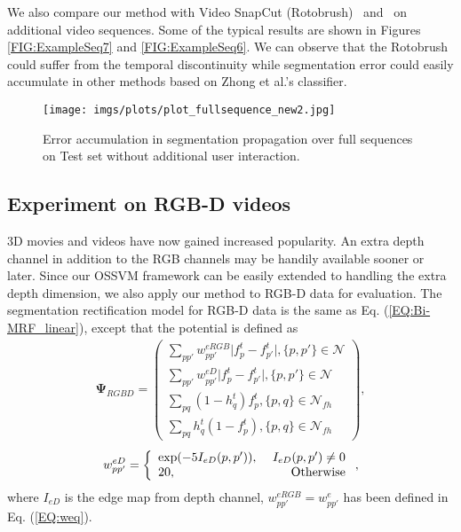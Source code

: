 \documentclass[10pt,journal,compsoc]{newIEEEtran}
\begin{document}
We also compare our method with Video SnapCut (Rotobrush)~\cite{Bai09VideoSnapCut_SIGGRAPH} and~\cite{Zhong2012UDC_SIGGRAPHAsia} on additional video sequences. Some of the typical results are shown in Figures \ref{FIG:ExampleSeq7} and \ref{FIG:ExampleSeq6}. We can observe that the Rotobrush could suffer from the temporal discontinuity while segmentation error could easily accumulate in other methods based on Zhong et al.'s classifier.
\begin{figure}[!t]
	\centering
	\texttt{[image: imgs/plots/plot\_fullsequence\_new2.jpg]}
	\caption{Error accumulation in segmentation propagation over full sequences on Test set without additional user interaction.  }\label{FIG:Rst_SeqPropag2}\vspace{-0.5cm}
\end{figure}\subsection{Experiment on RGB-D videos}
3D movies and videos have now gained increased popularity. An extra depth channel in addition to the RGB channels may be handily available sooner or later. Since our OSSVM framework can be easily extended to handling the extra depth dimension, we also apply our method to RGB-D data for evaluation. The segmentation rectification model for RGB-D data is the same as Eq. (\ref{EQ:Bi-MRF_linear}), except that the potential is defined as
\begin{equation}\label{EQ:DefinePsiRGBD}
\begin{split}
\mathbf{\Psi}_{RGBD} = \left(\begin{array}{l}
\sum_{pp'}w^{eRGB}_{pp'} \big|f^{t}_p-{f^{t}_{p'}}\big|,\{p,p'\}\in\mathcal{N} \\
\sum_{pp'}w^{eD}_{pp'} \big|f^{t}_p-{f^{t}_{p'}}\big|,\{p,p'\}\in\mathcal{N}\\
\sum_{pq}(1-h^t_q)f^{t}_p,\{p,q\}\in\mathcal{N}_{fh} \\
\sum_{pq}h^t_q(1-f^{t}_p),\{p,q\}\in\mathcal{N}_{fh}
\end{array}\right),
\end{split}
\end{equation}\begin{equation}\label{EQ:weqRGBD}
w^{eD}_{pp'}=\left\{\begin{array}{lr}
\exp(-5I_{eD}(p,p')),~ & I_{eD}(p,p')\neq0 \\
20,~ & \hbox{Otherwise}
\end{array}
\right.,
\end{equation}
where $I_{eD}$ is the edge map from depth channel, $w^{eRGB}_{pp'}=w^e_{pp'}$ has been defined in Eq. (\ref{EQ:weq}).
\end{document}
